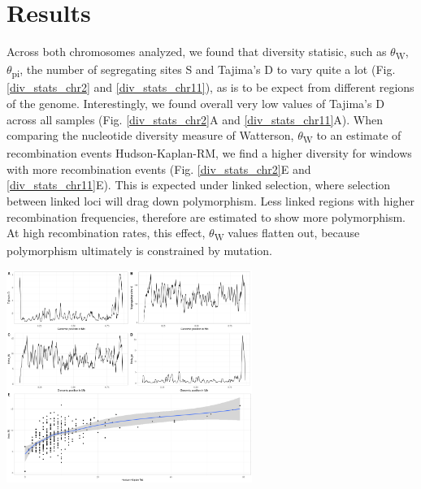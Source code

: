 \documentclass[11pt]{article}
\begin{document}
\section*{Results}
\label{sec:orgc32c3bf}
Across both chromosomes analyzed, we found that diversity statisic, such as \(\theta\)\textsubscript{W}, \(\theta\)\textsubscript{pi}, the number of segregating sites S and Tajima's D to vary quite a lot (Fig. \ref{div_stats_chr2} and \ref{div_stats_chr11}), as is to be expect from different regions of the genome. Interestingly, we found overall very low values of Tajima's D across all samples (Fig. \ref{div_stats_chr2}A and \ref{div_stats_chr11}A). When comparing the nucleotide diversity measure of Watterson, \(\theta\)\textsubscript{W} to an estimate of recombination events Hudson-Kaplan-RM, we find a higher diversity for windows with more recombination events (Fig. \ref{div_stats_chr2}E and \ref{div_stats_chr11}E). This is expected under linked selection, where selection between linked loci will drag down polymorphism. Less linked regions with higher recombination frequencies, therefore are estimated to show more polymorphism. At high recombination rates, this effect, \(\theta\)\textsubscript{W} values flatten out, because polymorphism ultimately is constrained by mutation.

\begin{center}
\includegraphics[width=0.6\textwidth]{./figures/stats_panel_chr2.png}
\end{center}
\end{document}
